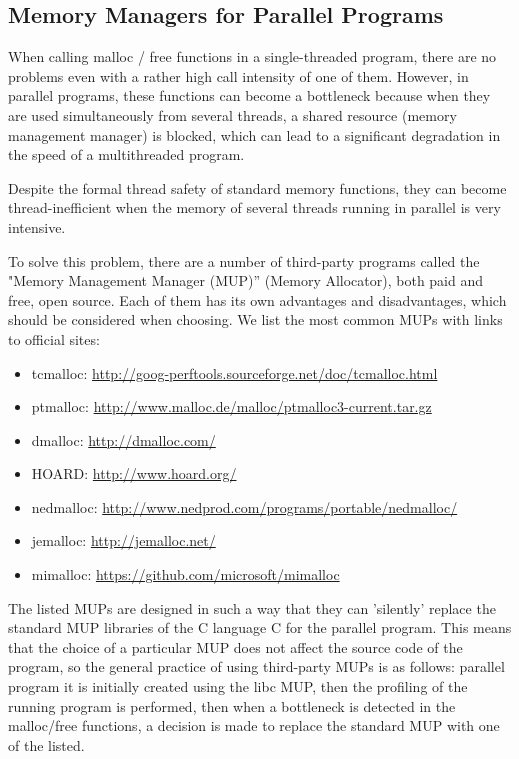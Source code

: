 { %
	\subsection{Memory Managers for Parallel Programs}
	\par When calling malloc / free functions in a single-threaded program, there are no problems even with a rather high call intensity of one of them. However, in parallel programs, these functions can become a bottleneck because when they are used simultaneously from several threads, a shared resource (memory management manager) is blocked, which can lead to a significant degradation in the speed of a multithreaded program.
	\par Despite the formal thread safety of standard memory functions, they can become thread-inefficient when the memory of several threads running in parallel is very intensive.
	\par To solve this problem, there are a number of third-party programs called the "Memory Management Manager (MUP)'' (Memory Allocator), both paid and free, open source. Each of them has its own advantages and disadvantages, which should be considered when choosing. We list the most common MUPs with links to official sites:
	\begin{itemize}
		\sloppy
		\item tcmalloc: \url{http://goog-perftools.sourceforge.net/doc/tcmalloc.html}
		\item ptmalloc: \url{http://www.malloc.de/malloc/ptmalloc3-current.tar.gz}
		\item dmalloc: \url{http://dmalloc.com/}
		\item HOARD: \url{http://www.hoard.org/}
		\item nedmalloc: \url{http://www.nedprod.com/programs/portable/nedmalloc/}
		\item jemalloc: \url{http://jemalloc.net/}
		\item mimalloc: \url{https://github.com/microsoft/mimalloc}
	\end{itemize}
	\par The listed MUPs are designed in such a way that they can 'silently' replace the standard MUP libraries of the C language C for the parallel program. This means that the choice of a particular MUP does not affect the source code of the program, so the general practice of using third-party MUPs is as follows: parallel program it is initially created using the libc MUP, then the profiling of the running program is performed, then when a bottleneck is detected in the malloc/free functions, a decision is made to replace the standard MUP with one of the listed.
	\par
	\par
}